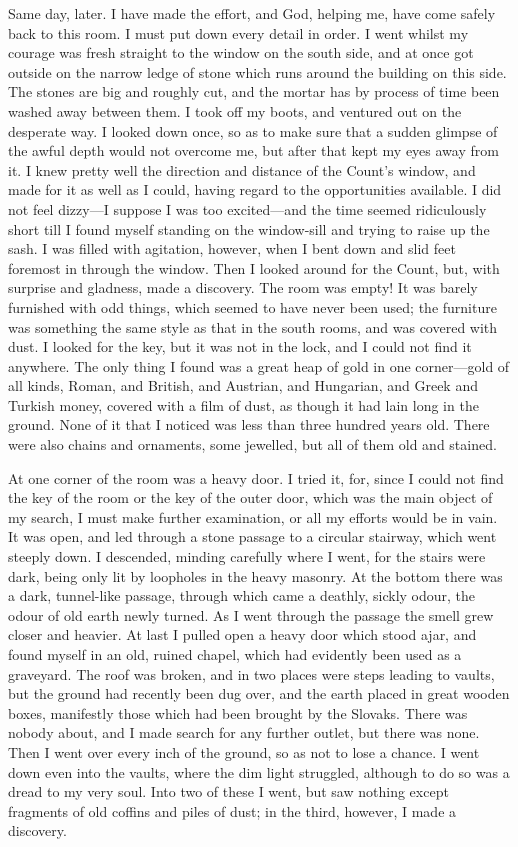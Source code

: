 \begin{diary}{Same day, later.}
I have made the effort, and God, helping me, have come safely back to this room. I must put down every detail in order. I went whilst my courage was fresh straight to the window on the south side, and at once got outside on the narrow ledge of stone which runs around the building on this side. The stones are big and roughly cut, and the mortar has by process of time been washed away between them. I took off my boots, and ventured out on the desperate way. I looked down once, so as to make sure that a sudden glimpse of the awful depth would not overcome me, but after that kept my eyes away from it. I knew pretty well the direction and distance of the Count's window, and made for it as well as I could, having regard to the opportunities available. I did not feel dizzy—I suppose I was too excited—and the time seemed ridiculously short till I found myself standing on the window-sill and trying to raise up the sash. I was filled with agitation, however, when I bent down and slid feet foremost in through the window. Then I looked around for the Count, but, with surprise and gladness, made a discovery. The room was empty! It was barely furnished with odd things, which seemed to have never been used; the furniture was something the same style as that in the south rooms, and was covered with dust. I looked for the key, but it was not in the lock, and I could not find it anywhere. The only thing I found was a great heap of gold in one corner—gold of all kinds, Roman, and British, and Austrian, and Hungarian, and Greek and Turkish money, covered with a film of dust, as though it had lain long in the ground. None of it that I noticed was less than three hundred years old. There were also chains and ornaments, some jewelled, but all of them old and stained.

At one corner of the room was a heavy door. I tried it, for, since I could not find the key of the room or the key of the outer door, which was the main object of my search, I must make further examination, or all my efforts would be in vain. It was open, and led through a stone passage to a circular stairway, which went steeply down. I descended, minding carefully where I went, for the stairs were dark, being only lit by loopholes in the heavy masonry. At the bottom there was a dark, tunnel-like passage, through which came a deathly, sickly odour, the odour of old earth newly turned. As I went through the passage the smell grew closer and heavier. At last I pulled open a heavy door which stood ajar, and found myself in an old, ruined chapel, which had evidently been used as a graveyard. The roof was broken, and in two places were steps leading to vaults, but the ground had recently been dug over, and the earth placed in great wooden boxes, manifestly those which had been brought by the Slovaks. There was nobody about, and I made search for any further outlet, but there was none. Then I went over every inch of the ground, so as not to lose a chance. I went down even into the vaults, where the dim light struggled, although to do so was a dread to my very soul. Into two of these I went, but saw nothing except fragments of old coffins and piles of dust; in the third, however, I made a discovery.


\end{diary}

